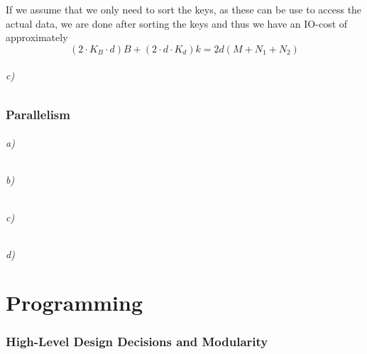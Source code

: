 \documentclass[a4paper, 11pt]{article}
\begin{document}
If we assume that we only need to sort the keys, as these can be use to access the actual data, we are done after sorting the keys and thus we have an IO-cost of approximately
\[
    (2 \cdot K_B \cdot d) B + (2 \cdot d \cdot K_d) k =
    2 d (M + N_1 + N_2)
\]


\paragraph{c)} %



\section{Parallelism} %
\label{sec:parallelism}

\paragraph{a)} %


\paragraph{b)} %


\paragraph{c)} %


\paragraph{d)} %




\newpage
\part{Programming} %
\label{prt:programming_}

\section{High-Level Design Decisions and Modularity} %
\label{sec:high_level_design_decisions_and_modularity}
\end{document}
